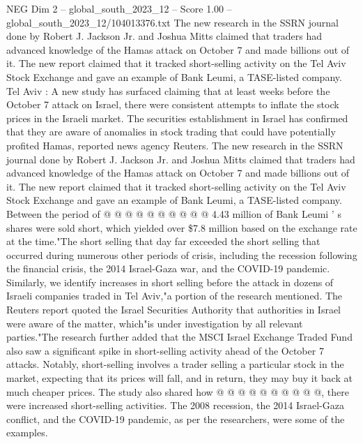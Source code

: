 \begin{textsample}{NEG Dim 2 – global\_south\_2023\_12 – Score 1.00 – global\_south\_2023\_12/104013376.txt}  \label{ex:f2_neg_421}
The new research in the SSRN journal done by Robert J.
Jackson Jr. and Joshua Mitts claimed that traders had advanced knowledge of the Hamas attack on October 7 and made billions out of it.
The new report claimed that it tracked short-selling activity on the Tel Aviv Stock Exchange and gave an example of Bank Leumi, a TASE-listed company.
Tel Aviv : A new study has surfaced claiming that at least weeks before the October 7 attack on Israel, there were consistent attempts to inflate the stock prices in the Israeli market.
The securities establishment in Israel has confirmed that they are aware of anomalies in stock trading that could have potentially profited Hamas, reported news agency Reuters.
The new research in the SSRN journal done by Robert J.
Jackson Jr. and Joshua Mitts claimed that traders had advanced knowledge of the Hamas attack on October 7 and made billions out of it.
The new report claimed that it tracked short-selling activity on the Tel Aviv Stock Exchange and gave an example of Bank Leumi, a TASE-listed company.
Between the period of @ @ @ @ @ @ @ @ @ @ 4.43 million of Bank Leumi ' s shares were sold short, which yielded over \$7.8 million based on the exchange rate at the time."The short selling that day far exceeded the short selling that occurred during numerous other periods of crisis, including the recession following the financial crisis, the 2014 Israel-Gaza war, and the COVID-19 pandemic.
Similarly, we identify increases in short selling before the attack in dozens of Israeli companies traded in Tel Aviv,"a portion of the research mentioned.
The Reuters report quoted the Israel Securities Authority that authorities in Israel were aware of the matter, which"is under investigation by all relevant parties."The research further added that the MSCI Israel Exchange Traded Fund also saw a significant spike in short-selling activity ahead of the October 7 attacks.
Notably, short-selling involves a trader selling a particular stock in the market, expecting that its prices will fall, and in return, they may buy it back at much cheaper prices.
The study also shared how @ @ @ @ @ @ @ @ @ @, there were increased short-selling activities.
The 2008 recession, the 2014 Israel-Gaza conflict, and the COVID-19 pandemic, as per the researchers, were some of the examples.

\end{textsample}
